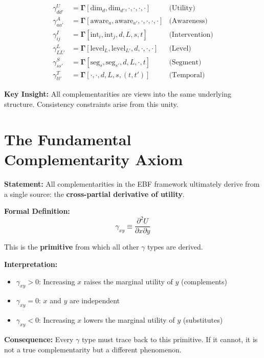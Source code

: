 \begin{align}
\gamma^U_{dd'} &= \boldsymbol{\Gamma}[\text{dim}_d, \text{dim}_{d'}, \cdot, \cdot, \cdot, \cdot]
    & \text{(Utility)} \\
\gamma^A_{aa'} &= \boldsymbol{\Gamma}[\text{aware}_a, \text{aware}_{a'}, \cdot, \cdot, \cdot, \cdot]
    & \text{(Awareness)} \\
\gamma^I_{ij} &= \boldsymbol{\Gamma}[\text{int}_i, \text{int}_j, d, L, s, t]
    & \text{(Intervention)} \\
\gamma^L_{LL'} &= \boldsymbol{\Gamma}[\text{level}_L, \text{level}_{L'}, d, \cdot, \cdot, \cdot]
    & \text{(Level)} \\
\gamma^S_{ss'} &= \boldsymbol{\Gamma}[\text{seg}_s, \text{seg}_{s'}, d, L, \cdot, t]
    & \text{(Segment)} \\
\gamma^T_{tt'} &= \boldsymbol{\Gamma}[\cdot, \cdot, d, L, s, (t, t')]
    & \text{(Temporal)}
\end{align}

\textbf{Key Insight:} All complementarities are views into the same underlying
structure. Consistency constraints arise from this unity.

\section{The Fundamental Complementarity Axiom}
\label{sec:gtc-axiom}

\begin{tcolorbox}[colback=blue!5!white, colframe=blue!75!black,
    title=Axiom GTC-1: The Source Axiom]

\textbf{Statement:} All complementarities in the EBF framework ultimately derive
from a single source: the \textbf{cross-partial derivative of utility}.

\textbf{Formal Definition:}
\begin{equation}
\boxed{
\gamma_{xy} \equiv \frac{\partial^2 U}{\partial x \partial y}
}
\end{equation}

This is the \textbf{primitive} from which all other $\gamma$ types are derived.

\textbf{Interpretation:}
\begin{itemize}[nosep]
    \item $\gamma_{xy} > 0$: Increasing $x$ raises the marginal utility of $y$ (complements)
    \item $\gamma_{xy} = 0$: $x$ and $y$ are independent
    \item $\gamma_{xy} < 0$: Increasing $x$ lowers the marginal utility of $y$ (substitutes)
\end{itemize}

\textbf{Consequence:} Every $\gamma$ type must trace back to this primitive.
If it cannot, it is not a true complementarity but a different phenomenon.

\end{tcolorbox}

